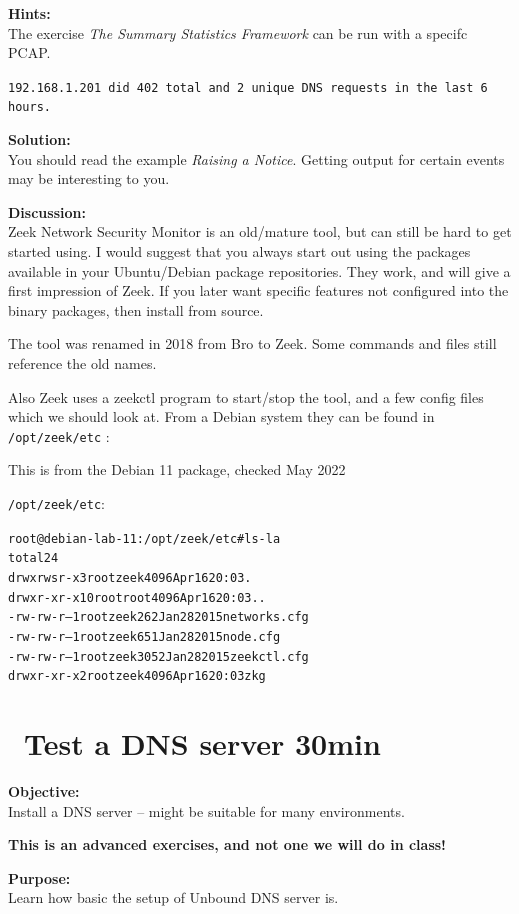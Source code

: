 \documentclass[a4paper,11pt,notitlepage]{report}
\begin{document}
{\bf Hints:}\\
The exercise
\emph{The Summary Statistics Framework} can be run with a specifc PCAP.

\verb+192.168.1.201 did 402 total and 2 unique DNS requests in the last 6 hours.+

{\bf Solution:}\\
You should read the example \emph{Raising a Notice}. Getting output for certain events may be interesting to you.


{\bf Discussion:}\\
Zeek Network Security Monitor is an old/mature tool, but can still be hard to get started using. I would suggest that you always start out using the packages available in your Ubuntu/Debian package repositories.  They work, and will give a first impression of Zeek. If you later want specific features not configured into the binary packages, then install from source.

The tool was renamed in 2018 from Bro to Zeek. Some commands and files still reference the old names.

Also Zeek uses a zeekctl program to start/stop the tool, and a few config files which we should look at. From a Debian system they can be found in \verb+/opt/zeek/etc+ :

This is from the Debian 11 package, checked May 2022

\verb+/opt/zeek/etc+:
\begin{alltt}
root@debian-lab-11:/opt/zeek/etc# ls -la
total 24
drwxrwsr-x  3 root zeek 4096 Apr 16 20:03 .
drwxr-xr-x 10 root root 4096 Apr 16 20:03 ..
-rw-rw-r--  1 root zeek  262 Jan 28  2015 networks.cfg
-rw-rw-r--  1 root zeek  651 Jan 28  2015 node.cfg
-rw-rw-r--  1 root zeek 3052 Jan 28  2015 zeekctl.cfg
drwxr-xr-x  2 root zeek 4096 Apr 16 20:03 zkg
\end{alltt}




\chapter{\faInfoCircle\ Test a DNS server 30min}
\label{ex:dns-server-test}

{\bf Objective:}\\
Install a DNS server -- might be suitable for many environments.

{\bf This is an advanced exercises, and not one we will do in class!}

{\bf Purpose:}\\
Learn how basic the setup of Unbound DNS server is.
\end{document}

